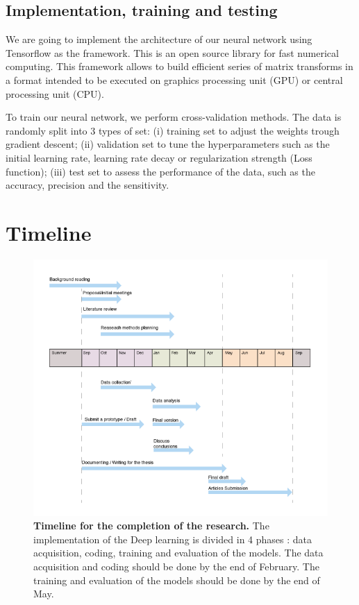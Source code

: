 \documentclass[12pt]{article}
\begin{document}
\subsection{Implementation, training and testing}

We are going to implement the architecture of our neural network using Tensorflow\autocite{abadi2016} as the framework. This is an open source library for fast numerical computing. This framework allows to build efficient series of matrix transforms in a format intended to be executed on graphics processing unit (GPU) or central processing unit (CPU). 

To train our neural network, we perform cross-validation methods. The data is randomly split into 3 types of set: (i) training set to adjust the weights trough gradient descent; (ii) validation set to tune the hyperparameters such as the initial learning rate, learning rate decay or regularization strength (Loss function); (iii) test set to assess the performance of the data, such as the accuracy, precision and the sensitivity. 

\section{Timeline}

\begin{figure}[h]
    \centering
    \includegraphics[width=\textwidth]{figure-2.png}
    \caption{ \textbf{Timeline for the completion of the research.} The implementation of the Deep learning is divided in 4 phases : data acquisition, coding, training and evaluation of the models. The data acquisition and coding should be done by the end of February. The training and evaluation of the models should be done by the end of May.}
    \label{fig:plan}
\end{figure}
\end{document}
